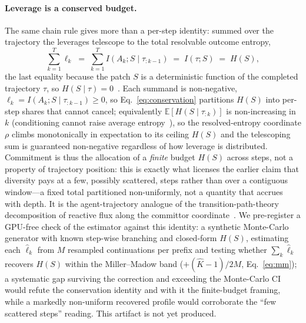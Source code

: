 \documentclass[11pt]{article}
\newcommand{\strat}{S}
\begin{document}
\paragraph{Leverage is a conserved budget.}
The same chain rule gives more than a per-step identity: summed over the
trajectory the leverages telescope to the total resolvable outcome entropy,
\begin{equation}
\sum_{k=1}^{T}\ell_k \;=\; \sum_{k=1}^{T} I(A_k;\strat\mid\tau_{:k-1})
\;=\; I(\tau;\strat) \;=\; H(\strat),
\label{eq:conservation}
\end{equation}
the last equality because the patch $\strat$ is a deterministic function of the
completed trajectory $\tau$, so $H(\strat\mid\tau)=0$~\citep{cover2006elements}.
Each summand is non-negative, $\ell_k=I(A_k;\strat\mid\tau_{:k-1})\ge0$, so
Eq.~\eqref{eq:conservation} partitions $H(\strat)$ into per-step shares that cannot
cancel; equivalently $\mathbb{E}[H(\strat\mid\tau_{:k})]$ is non-increasing in $k$
(conditioning cannot raise average entropy~\citep{cover2006elements}), so the
resolved-entropy coordinate $\rho$ climbs monotonically in expectation to its
ceiling $H(\strat)$ and the telescoping sum is guaranteed non-negative regardless of
how leverage is distributed.
Commitment is thus the allocation of a \emph{finite} budget $H(\strat)$ across
steps, not a property of trajectory position: this is exactly what licenses the
earlier claim that diversity pays at a few, possibly scattered, steps rather than
over a contiguous window---a fixed total partitioned non-uniformly, not a quantity
that accrues with depth. It is the agent-trajectory analogue of the
transition-path-theory decomposition of reactive flux along the committor
coordinate~\citep{evanden2010tpt}. We pre-register a GPU-free check of the
estimator against this identity: a synthetic Monte-Carlo generator with known
step-wise branching and closed-form $H(\strat)$, estimating each $\widehat\ell_k$
from $M$ resampled continuations per prefix and testing whether
$\sum_k\widehat\ell_k$ recovers $H(\strat)$ within the Miller--Madow band
($+(\hat K-1)/2M$, Eq.~\eqref{eq:mm}); a systematic gap surviving the correction
and exceeding the Monte-Carlo CI would refute the conservation identity and with it
the finite-budget framing, while a markedly non-uniform recovered profile would
corroborate the ``few scattered steps'' reading. This artifact is not yet produced.
\end{document}
